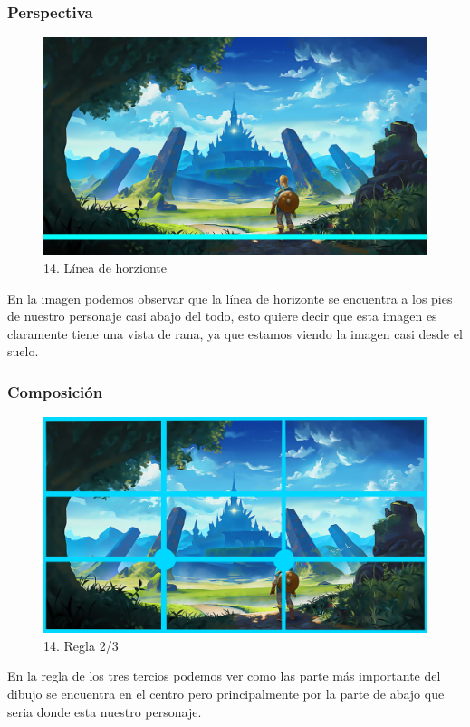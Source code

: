 \documentclass[12pt]{article}
\begin{document}
    \subsubsection{Perspectiva}
    \begin{figure}[H]
      \centering
      \includegraphics[width=\textwidth]{images/Selena/14_concept_art linia.jpg}
      \caption{\small 14. Línea de horzionte}
    \end{figure}
    En la imagen podemos observar que la línea de horizonte se encuentra a los pies de nuestro personaje casi abajo del todo, esto quiere decir que esta imagen es claramente tiene una vista de rana, ya que estamos viendo la imagen casi desde el suelo.

    
    \subsubsection{Composición}

    \begin{figure}[H]
      \centering
      \includegraphics[width=\textwidth]{images/Selena/14 3.3.jpg}
      \caption{\small 14. Regla 2/3}
    \end{figure}
    En la regla de los tres tercios podemos ver como las parte más importante del dibujo se encuentra en el centro pero principalmente por la parte de abajo que seria donde esta nuestro personaje. 
\end{document}
